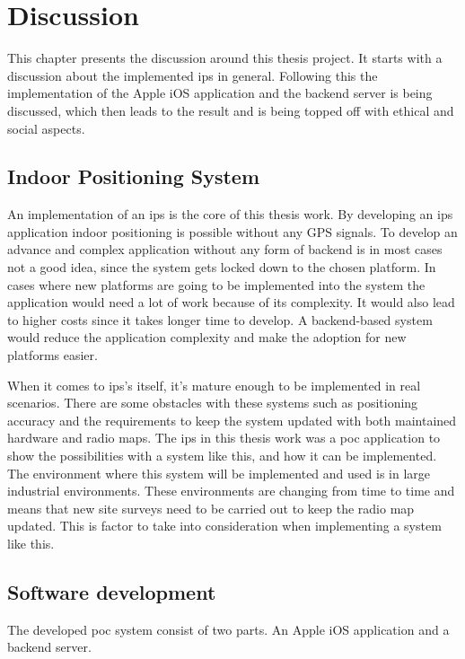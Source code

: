 \chapter{Discussion} \label{discussion}
This chapter presents the discussion around this thesis project.
It starts with a discussion about the implemented \acrfull{ips} in general.
Following this the implementation of the Apple iOS application and the backend server is being discussed, which then leads to the result and is being topped off with ethical and social aspects.


\section{Indoor Positioning System}\label{sec:discussionIps}
An implementation of an \acrshort{ips} is the core of this thesis work.
By developing an \acrshort{ips} application indoor positioning is possible without any GPS signals.
To develop an advance and complex application without any form of backend is in most cases not a good idea, since the system gets locked down to the chosen platform.
In cases where new platforms are going to be implemented into the system the application would need a lot of work because of its complexity.
It would also lead to  higher costs since it takes longer time to develop.
A backend-based system would reduce the application complexity and make the adoption for new platforms easier.

\bigskip

When it comes to \acrshort{ips}'s itself, it's mature enough to be implemented in real scenarios.
There are some obstacles with these systems such as positioning accuracy and the requirements to keep the system updated with both maintained hardware and radio maps.
The \acrshort{ips} in this thesis work was a \acrfull{poc} application to show the possibilities with a system like this, and how it can be implemented.
The environment where this system will be implemented and used is in large industrial environments.
These environments are changing from time to time and means that new site surveys need to be carried out to keep the radio map updated.
This is factor to take into consideration when implementing a system like this.


\section{Software development}
The developed \acrshort{poc} system consist of two parts.
An Apple iOS application and a backend server.


